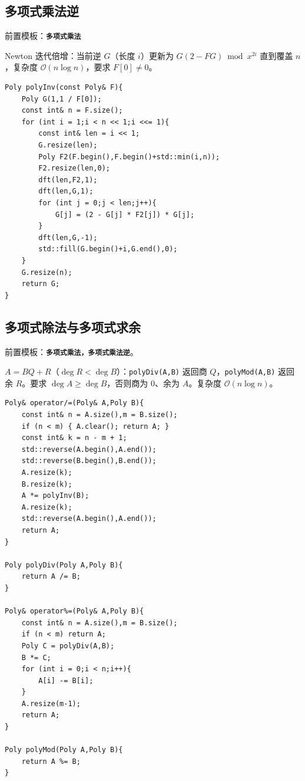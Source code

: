 \subsection{多项式乘法逆}

前置模板：\textbf{\texttt{多项式乘法}}

Newton 迭代倍增：当前逆 $G$（长度 $i$）更新为 $G(2-FG)\bmod x^{2i}$ 直到覆盖 $n$，复杂度 $\mathcal{O}(n\log n)$，要求 $F[0]\neq 0$。

\begin{lstlisting}
Poly polyInv(const Poly& F){
    Poly G(1,1 / F[0]);
    const int& n = F.size();
    for (int i = 1;i < n << 1;i <<= 1){
        const int& len = i << 1;
        G.resize(len);
        Poly F2(F.begin(),F.begin()+std::min(i,n));
        F2.resize(len,0);
        dft(len,F2,1);
        dft(len,G,1);
        for (int j = 0;j < len;j++){
            G[j] = (2 - G[j] * F2[j]) * G[j];
        }
        dft(len,G,-1);
        std::fill(G.begin()+i,G.end(),0);
    }
    G.resize(n);
    return G;
}
\end{lstlisting}

\subsection{多项式除法与多项式求余}

前置模板：\textbf{\texttt{多项式乘法，多项式乘法逆}}。

$A=BQ+R$（$\deg R<\deg B$）：\texttt{polyDiv(A,B)} 返回商 $Q$，\texttt{polyMod(A,B)} 返回余 $R$。要求 $\deg A\ge\deg B$，否则商为 $0$、余为 $A$。复杂度 $\mathcal{O}(n\log n)$。

\begin{lstlisting}
Poly& operator/=(Poly& A,Poly B){
    const int& n = A.size(),m = B.size();
    if (n < m) { A.clear(); return A; }
    const int& k = n - m + 1;
    std::reverse(A.begin(),A.end());
    std::reverse(B.begin(),B.end());
    A.resize(k);
    B.resize(k);
    A *= polyInv(B);
    A.resize(k);
    std::reverse(A.begin(),A.end());
    return A;
}

Poly polyDiv(Poly A,Poly B){
    return A /= B;
}

Poly& operator%=(Poly& A,Poly B){
    const int& n = A.size(),m = B.size();
    if (n < m) return A;
    Poly C = polyDiv(A,B);
    B *= C;
    for (int i = 0;i < n;i++){
        A[i] -= B[i];
    }
    A.resize(m-1);
    return A;
}

Poly polyMod(Poly A,Poly B){
    return A %= B;
}
\end{lstlisting}

